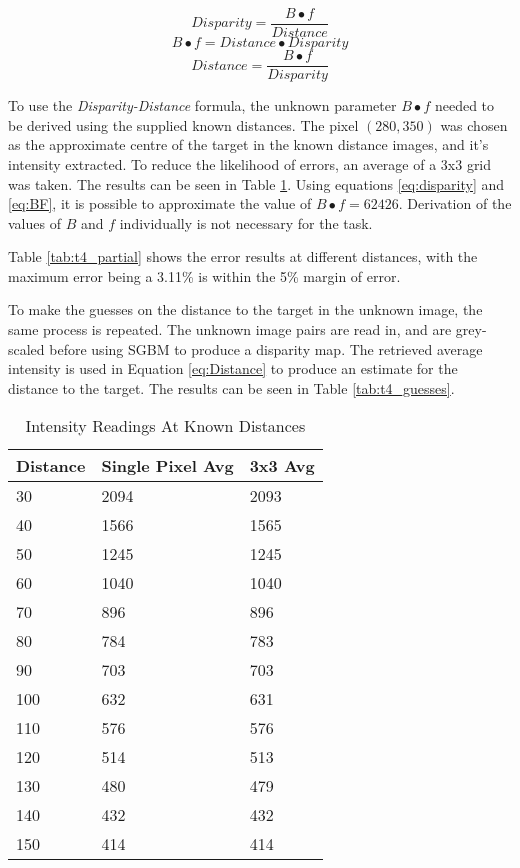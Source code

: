 \documentclass[conference]{IEEEtran}
\begin{document}
\begin{equation} \label{eq:disparity}
Disparity = \frac{B \bullet f}{Distance}
\end{equation}
\begin{equation} \label{eq:BF}
B \bullet f = Distance \bullet Disparity
\end{equation}
\begin{equation}	\label{eq:Distance}
Distance = \frac{B\bullet f}{Disparity}
\end{equation}

To use the \textit{Disparity-Distance} formula, the unknown parameter $B \bullet f$ needed to be derived using the supplied known distances. The pixel $(280,350)$ was chosen as the approximate centre of the target in the known distance images, and it's intensity extracted. To reduce the likelihood of errors, an average of a 3x3 grid was taken. The results can be seen in Table \ref{tab:intensity_results}. Using equations \ref{eq:disparity} and \ref{eq:BF}, it is possible to approximate the value of $B \bullet f = 62426$. Derivation of the values of $B$ and $f$ individually is not necessary for the task. 

Table \ref{tab:t4_partial} shows the error results at different distances, with the maximum error being a 3.11\% is within the 5\% margin of error.

To make the guesses on the distance to the target in the unknown image, the same process is repeated. The unknown image pairs are read in, and are grey-scaled before using SGBM to produce a disparity map. The retrieved average intensity is used in Equation \ref{eq:Distance} to produce an estimate for the distance to the target. The results can be seen in Table \ref{tab:t4_guesses}. 

\begin{table}[]
\caption{Intensity Readings At Known Distances}
\label{tab:intensity_results}
\begin{tabular}{|l|l|l|}
\hline
\textbf{Distance} & \textbf{Single Pixel Avg} & \textbf{3x3 Avg} \\ \hline
30                 & 2094 & 2093         \\ \hline
40                & 1566 & 1565         \\ \hline
50                 & 1245 & 1245         \\ \hline
60                 & 1040 & 1040         \\ \hline
70                 & 896 & 896         \\ \hline
80                & 784 & 783         \\ \hline
90                & 703 & 703         \\ \hline
100                 & 632 & 631          \\ \hline
110      & 576 & 576           \\ \hline
120      & 514 & 513         \\ \hline
130                 & 480 &479          \\ \hline
140				& 432	& 432	\\ \hline
150				&	414 & 414	\\ \hline
\end{tabular}
\end{table} 
\end{document}
